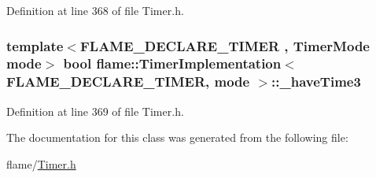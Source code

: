 Definition at line 368 of file Timer.\-h.

\hypertarget{classflame_1_1_timer_implementation_a171e3dafa1a40ee3c4660f52eb2582da}{
\subsubsection[{\-\_\-have\-Time3}]{\setlength{\rightskip}{0pt plus 5cm}template$<$F\-L\-A\-M\-E\-\_\-\-D\-E\-C\-L\-A\-R\-E\-\_\-\-T\-I\-M\-E\-R , Timer\-Mode mode$>$ bool {\bf flame\-::\-Timer\-Implementation}$<$ {\bf F\-L\-A\-M\-E\-\_\-\-D\-E\-C\-L\-A\-R\-E\-\_\-\-T\-I\-M\-E\-R}, mode $>$\-::\-\_\-have\-Time3\hspace{0.3cm}{\ttfamily [protected]}}}\label{classflame_1_1_timer_implementation_a171e3dafa1a40ee3c4660f52eb2582da}


Definition at line 369 of file Timer.\-h.



The documentation for this class was generated from the following file\-:\begin{DoxyCompactItemize}
\item 
flame/\hyperlink{_timer_8h}{Timer.\-h}\end{DoxyCompactItemize}
